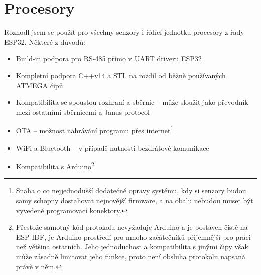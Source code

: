 \section{Procesory}

Rozhodl jsem se použít pro všechny senzory i řídící jednotku procesory z řady ESP32.
Některé z důvodů:
\begin{itemize}
    \item Build-in podpora pro RS-485 přímo v UART driveru ESP32
    \item Kompletní podpora C++v14 a STL na rozdíl od běžně používaných ATMEGA čipů
    \item Kompatibilita se spoustou rozhraní a sběrnic -- může sloužit jako převodník mezi ostatními sběrnicemi a Janus protocol
    \item OTA -- možnost nahrávání programu přes internet\footnote{Snaha o co nejjednodušší dodatečné opravy systému, kdy si senzory budou samy schopny dostahovat nejnovější firmware, a na obalu nebudou muset být vyvedené programovací konektory.}
    \item WiFi a Bluetooth -- v případě nutnosti bezdrátové komunikace
    \item Kompatibilita s Arduino\footnote{Přestože samotný kód protokolu nevyžaduje Arduino a je postaven čistě na ESP-IDF, je Arduino prostředí pro mnoho začátečníků přijemnější pro práci než většina ostatních. Jeho jednoduchost a kompatibilita s jinými čipy však může zásadně limitovat jeho funkce, proto není obsluha protokolu napsaná právě v něm.}
\end{itemize}